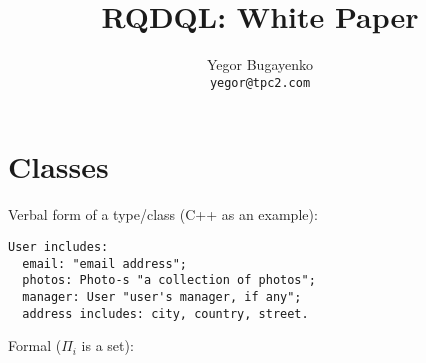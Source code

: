 \documentclass{article}
\begin{document}
\setlength{\parindent}{0pt}
\setlength{\parskip}{1em}
\newcommand{\type}[1]{\mbox{\texttt{#1}}}
\newenvironment{maths}
{
    \vspace*{0.5em}
    \begin{tabular}{l}
}
{
    \end{tabular}
    \vspace*{1em}
}

\title{RQDQL: White Paper}
\author{
    Yegor Bugayenko\\
    \texttt{yegor@tpc2.com}
}
\maketitle

\newpage
\section{Classes}

    Verbal form of a type/class (C++ as an example):

    \begin{verbatim}
User includes:
  email: "email address";
  photos: Photo-s "a collection of photos";
  manager: User "user's manager, if any";
  address includes: city, country, street.\end{verbatim}

    Formal ($\Pi_i$ is a set):
    
\end{document}
